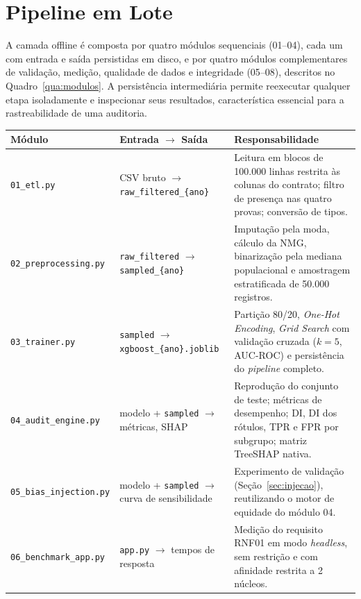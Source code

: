 \section{Pipeline em Lote}
\label{sec:pipeline}

A camada offline é composta por quatro módulos sequenciais (01--04), cada um com entrada e saída persistidas em disco, e por quatro módulos complementares de validação, medição, qualidade de dados e integridade (05--08), descritos no Quadro~\ref{qua:modulos}. A persistência intermediária permite reexecutar qualquer etapa isoladamente e inspecionar seus resultados, característica essencial para a rastreabilidade de uma auditoria.

\begin{quadro}[htbp]
\centering
\caption{Módulos do pipeline em lote}
\label{qua:modulos}
\small
\begin{tabular}{|>{\raggedright\arraybackslash}p{4.1cm}|>{\raggedright\arraybackslash}p{4.0cm}|>{\raggedright\arraybackslash}p{6.4cm}|}
\hline
\textbf{Módulo} & \textbf{Entrada $\rightarrow$ Saída} & \textbf{Responsabilidade} \\ \hline
\texttt{01\_etl.py} & CSV bruto $\rightarrow$ \texttt{raw\_filtered\_\{ano\}} & Leitura em blocos de 100.000 linhas restrita às colunas do contrato; filtro de presença nas quatro provas; conversão de tipos. \\ \hline
\texttt{02\_preprocessing.py} & \texttt{raw\_filtered} $\rightarrow$ \texttt{sampled\_\{ano\}} & Imputação pela moda, cálculo da NMG, binarização pela mediana populacional e amostragem estratificada de 50.000 registros. \\ \hline
\texttt{03\_trainer.py} & \texttt{sampled} $\rightarrow$ \texttt{xgboost\_\allowbreak\{ano\}.joblib} & Partição 80/20, \textit{One-Hot Encoding}, \textit{Grid Search} com validação cruzada ($k=5$, AUC-ROC) e persistência do \textit{pipeline} completo. \\ \hline
\texttt{04\_audit\_engine.py} & modelo + \texttt{sampled} $\rightarrow$ métricas, SHAP & Reprodução do conjunto de teste; métricas de desempenho; DI, DI dos rótulos, TPR e FPR por subgrupo; matriz TreeSHAP nativa. \\ \hline
\texttt{05\_bias\_injection.py} & modelo + \texttt{sampled} $\rightarrow$ curva de sensibilidade & Experimento de validação (Seção~\ref{sec:injecao}), reutilizando o motor de equidade do módulo 04. \\ \hline
\texttt{06\_benchmark\_app.py} & \texttt{app.py} $\rightarrow$ tempos de resposta & Medição do requisito RNF01 em modo \textit{headless}, sem restrição e com afinidade restrita a 2 núcleos. \\ \hline

\end{tabular}
\end{quadro}
